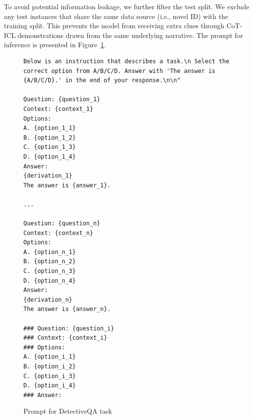 \documentclass{llmxive}
\begin{document}
To avoid potential information leakage, we further filter the test split. We exclude any test instances that share the same data source (i.e., novel ID) with the training split. This prevents the model from receiving extra clues through CoT-ICL demonstrations drawn from the same underlying narrative. The prompt for inference is presented in Figure~\ref{fig:prompt_dqa}. %
\vspace{-3mm}

\begin{figure}[ht]
    \centering
    {\tiny
\begin{lstlisting}
Below is an instruction that describes a task.\n Select the correct option from A/B/C/D. Answer with 'The answer is {A/B/C/D}.' in the end of your response.\n\n"

Question: {question_1}
Context: {context_1}
Options:
A. {option_1_1}
B. {option_1_2}
C. {option_1_3}
D. {option_1_4}
Answer:
{derivation_1}
The answer is {answer_1}.

...

Question: {question_n}
Context: {context_n}
Options:
A. {option_n_1}
B. {option_n_2}
C. {option_n_3}
D. {option_n_4}
Answer:
{derivation_n}
The answer is {answer_n}.

### Question: {question_i}
### Context: {context_i}
### Options:
A. {option_i_1}
B. {option_i_2}
C. {option_i_3}
D. {option_i_4}
### Answer:

\end{lstlisting}
}
    \caption{Prompt for DetectiveQA task}
    \label{fig:prompt_dqa}
\end{figure}
\end{document}
